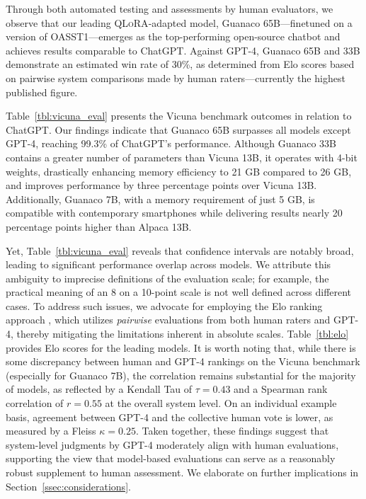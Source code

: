 Through both automated testing and assessments by human evaluators, we observe that our leading \textsc{QLoRA}-adapted model, {Guanaco} 65B—finetuned on a version of OASST1—emerges as the top-performing open-source chatbot and achieves results comparable to ChatGPT. Against GPT-4, {Guanaco} 65B and 33B demonstrate an estimated win rate of 30\%, as determined from Elo scores based on pairwise system comparisons made by human raters—currently the highest published figure.

Table~\ref{tbl:vicuna_eval} presents the Vicuna benchmark outcomes \cite{vicuna2023} in relation to ChatGPT. Our findings indicate that {Guanaco} 65B surpasses all models except GPT-4, reaching 99.3\% of ChatGPT’s performance. Although {Guanaco} 33B contains a greater number of parameters than Vicuna 13B, it operates with 4-bit weights, drastically enhancing memory efficiency to 21 GB compared to 26 GB, and improves performance by three percentage points over Vicuna 13B. Additionally, {Guanaco} 7B, with a memory requirement of just 5 GB, is compatible with contemporary smartphones while delivering results nearly 20 percentage points higher than Alpaca 13B.

Yet, Table~\ref{tbl:vicuna_eval} reveals that confidence intervals are notably broad, leading to significant performance overlap across models. We attribute this ambiguity to imprecise definitions of the evaluation scale; for example, the practical meaning of an 8 on a 10-point scale is not well defined across different cases. To address such issues, we advocate for employing the Elo ranking approach \citep{elo1967proposed}, which utilizes \textit{pairwise} evaluations from both human raters and GPT-4, thereby mitigating the limitations inherent in absolute scales. Table~\ref{tbl:elo} provides Elo scores for the leading models. It is worth noting that, while there is some discrepancy between human and GPT-4 rankings on the Vicuna benchmark (especially for Guanaco 7B), the correlation remains substantial for the majority of models, as reflected by a Kendall Tau of $\tau=0.43$ and a Spearman rank correlation of $r=0.55$ at the overall system level. On an individual example basis, agreement between GPT-4 and the collective human vote is lower, as measured by a Fleiss $\kappa=0.25$. Taken together, these findings suggest that system-level judgments by GPT-4 moderately align with human evaluations, supporting the view that model-based evaluations can serve as a reasonably robust supplement to human assessment. We elaborate on further implications in Section~\ref{ssec:considerations}.

